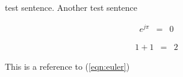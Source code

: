 \documentclass[a4paper]{article}
\begin{document}
test sentence. Another test sentence

\begin{eqnarray}
	\label{eqn:euler}
	e^{j\pi}&=& 0
\end{eqnarray}


\begin{eqnarray}
	\label{eqn:simple}
	1 + 1 &=& 2
\end{eqnarray}


This is a reference to (\ref{eqn:euler})
\end{document}
